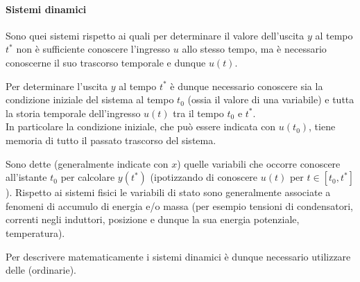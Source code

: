  	\paragraph{Sistemi dinamici} Sono  quei sistemi rispetto ai quali per determinare il valore dell'uscita $y$ al tempo $t^*$ non è sufficiente conoscere l'ingresso $u$ allo stesso tempo, ma è necessario conoscerne il suo trascorso temporale e dunque $u(t)$.
 	
 	Per determinare l'uscita $y$ al tempo $t^*$ è dunque necessario conoscere sia la condizione iniziale del sistema al tempo $t_0$ (ossia il valore di una variabile) e tutta la storia temporale dell'ingresso $u(t)$ tra il tempo $t_0$ e $t^*$. \\ In particolare la condizione iniziale, che può essere indicata con $u(t_0)$, tiene memoria di tutto il passato trascorso del sistema.
 	
 	
 	Sono dette  (generalmente indicate con $x$) quelle variabili che occorre conoscere all'istante $t_0$ per calcolare $y(t^*)$ (ipotizzando di conoscere $u(t)$ per $t\in [t_0,t^*]$). Rispetto ai sistemi fisici le variabili di stato sono generalmente associate a fenomeni di accumulo di energia e/o massa (per esempio tensioni di condensatori, correnti negli induttori, posizione e dunque la sua energia potenziale, temperatura).
 	
 	Per descrivere matematicamente i sistemi dinamici è dunque necessario utilizzare delle  (ordinarie).
 	
